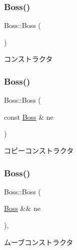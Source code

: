 \subsubsection{\texorpdfstring{Boss()}{Boss()}\hspace{0.1cm}{\footnotesize\ttfamily [1/3]}}
{\footnotesize\ttfamily Boss\+::\+Boss (\begin{DoxyParamCaption}{ }\end{DoxyParamCaption})\hspace{0.3cm}{\ttfamily [inline]}}



コンストラクタ 

\mbox{\label{class_boss_ae6bb99cbbbb4a5ae7db4d174e6f4b50e}} 
\subsubsection{\texorpdfstring{Boss()}{Boss()}\hspace{0.1cm}{\footnotesize\ttfamily [2/3]}}
{\footnotesize\ttfamily Boss\+::\+Boss (\begin{DoxyParamCaption}\item[{const \mbox{\hyperlink{class_boss}{Boss}} \&}]{ne }\end{DoxyParamCaption})\hspace{0.3cm}{\ttfamily [inline]}}



コピーコンストラクタ 

\mbox{\label{class_boss_a2e8bacd64a0212e890c62febaa37c988}} 
\subsubsection{\texorpdfstring{Boss()}{Boss()}\hspace{0.1cm}{\footnotesize\ttfamily [3/3]}}
{\footnotesize\ttfamily Boss\+::\+Boss (\begin{DoxyParamCaption}\item[{\mbox{\hyperlink{class_boss}{Boss}} \&\&}]{ne }\end{DoxyParamCaption})\hspace{0.3cm}{\ttfamily [inline]}, {\ttfamily [noexcept]}}



ムーブコンストラクタ 

